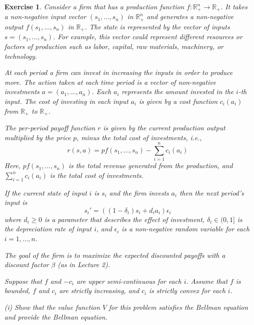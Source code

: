 \documentclass[letter,11pt]{article}
\newtheorem{exercise}{Exercise}[section]
\begin{document}
\begin{exercise}
Consider a firm   that has a production function \( f:\mathbb{R}^{n}_{+} \rightarrow \mathbb{R}_{+} \). It takes a non-negative input vector \((s_{1}, \ldots, s_{n})\) in $\mathbb{R}^{n}_{+}$ and generates a non-negative output \( f(s_{1}, \ldots, s_{n}) \) in $\mathbb{R}_{+}$. The state is represented by the vector of inputs \( s= (s_{1}, \ldots, s_{n})\). For example, this vector could represent different resources or factors of production such as labor, capital, raw materials, machinery, or technology.

At each period a firm can invest in increasing the inputs in order to produce more.  The action taken at each time period is a vector of non-negative investments \(a=(a_{1}, \ldots, a_{n})\).  Each \( a_{i} \) represents the amount invested in the \( i \)-th input.
The cost of investing in each input \( a_{i} \) is given by a  cost function \( c_{i}(a_{i}) \) from $\mathbb{R}_{+}$ to $\mathbb{R}_{+}$.

 The per-period payoff function $r$ is given by the current production output multiplied by the price \( p \), minus the total cost of investments, i.e., 
   \[
   r(s,a) = p f(s_{1}, \ldots, s_{n}) - \sum_{i=1}^{n} c_{i}(a_{i})
   \]
   Here, \( p f(s_{1}, \ldots, s_{n}) \) is the total revenue generated from the production, and \( \sum_{i=1}^{n} c_{i}(a_{i}) \) is the total cost of investments.

If the current state of input $i$ is $s_{i}$ and the firm invests $a_{i}$ then the next period's input is 
\begin{equation} \label{Eq:dynamicsExam}
     s_{i}' = ((1-\delta_{i}) s_{i} + d_{i}a_{i}) \epsilon_{i}
     \end{equation}
where $d_{i} \geq 0$ is a parameter that describes the effect of investment, $\delta_{i} \in (0,1]$ is the depreciation rate of input $i$, and $\epsilon_{i}$ is a non-negative random variable for each $i=1,\ldots,n$.   

The goal of the firm is to maximize the expected discounted payoffs with a discount factor $\beta$ (as in Lecture 2). 

Suppose that $f$ and $-c_{i}$ are upper semi-continuous for each $i$. Assume that $f$ is bounded, $f$ and $c_{i}$ are strictly increasing, and  $c_{i}$ is strictly convex for each $i$. 


(i) Show that the value function $V$ for this problem satisfies the Bellman equation and provide the Bellman equation. 


\end{exercise}
\end{document}
